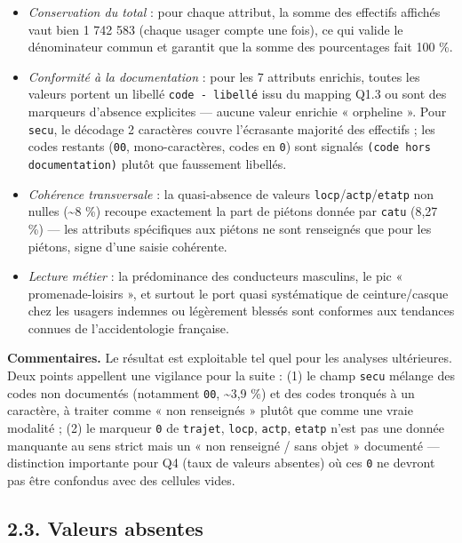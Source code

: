 \documentclass[11pt,a4paper]{article}
\newcommand{\rub}[2]{\textbf{\textcolor{#1}{#2}}}
\begin{document}
\begin{itemize}
\item \emph{Conservation du total} : pour chaque attribut, la somme des effectifs affichés vaut bien 1 742 583 (chaque usager compte une fois), ce qui valide le dénominateur commun et garantit que la somme des pourcentages fait 100 \%.
\item \emph{Conformité à la documentation} : pour les 7 attributs enrichis, toutes les valeurs portent un libellé \texttt{code - libellé} issu du mapping Q1.3 ou sont des marqueurs d'absence explicites — aucune valeur enrichie « orpheline ». Pour \texttt{secu}, le décodage 2 caractères couvre l'écrasante majorité des effectifs ; les codes restants (\texttt{00}, mono-caractères, codes en \texttt{0}) sont signalés \texttt{(code hors documentation)} plutôt que faussement libellés.
\item \emph{Cohérence transversale} : la quasi-absence de valeurs \texttt{locp}/\texttt{actp}/\texttt{etatp} non nulles (\textasciitilde{}8 \%) recoupe exactement la part de piétons donnée par \texttt{catu} (8,27 \%) — les attributs spécifiques aux piétons ne sont renseignés que pour les piétons, signe d'une saisie cohérente.
\item \emph{Lecture métier} : la prédominance des conducteurs masculins, le pic « promenade-loisirs », et surtout le port quasi systématique de ceinture/casque chez les usagers indemnes ou légèrement blessés sont conformes aux tendances connues de l'accidentologie française.
\end{itemize}

\rub{labcomment}{Commentaires.} Le résultat est exploitable tel quel pour les analyses ultérieures. Deux points appellent une vigilance pour la suite : (1) le champ \texttt{secu} mélange des codes non documentés (notamment \texttt{00}, \textasciitilde{}3,9 \%) et des codes tronqués à un caractère, à traiter comme « non renseignés » plutôt que comme une vraie modalité ; (2) le marqueur \texttt{0} de \texttt{trajet}, \texttt{locp}, \texttt{actp}, \texttt{etatp} n'est pas une donnée manquante au sens strict mais un « non renseigné / sans objet » documenté — distinction importante pour Q4 (taux de valeurs absentes) où ces \texttt{0} ne devront pas être confondus avec des cellules vides.

\subsection*{2.3. Valeurs absentes}
\end{document}
